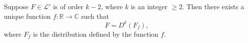 Suppose $F \in \mathcal{L}'$ is of order $k - 2$, where $k$ is an integer $\geq 2$. Then there exists a unique function $f: \mathbb{R} \to \mathbb{C}$ such that
$$F = D^k(F_f),$$
where $F_f$ is the distribution defined by the function $f$.
